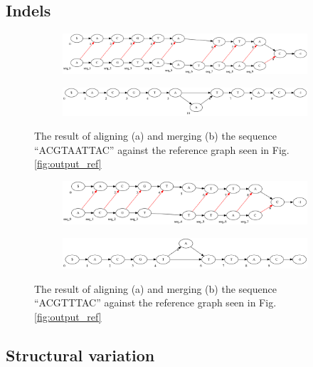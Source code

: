 \documentclass[thesis.tex]{subfiles}
\begin{document}
\subsection{Indels}
\begin{figure}[H]
  \begin{subfigure}[t]{\textwidth}
    \begin{mdframed}
      \includegraphics[width=\textwidth]{outputs/insertion-alignment.png}
    \end{mdframed}
    \subcaption{}
  \end{subfigure}
  \begin{subfigure}[t]{\textwidth}
    \begin{mdframed}
      \includegraphics[width=\textwidth]{outputs/insertion-merge.png}
    \end{mdframed}
    \subcaption{}
  \end{subfigure}
  \caption{The result of aligning (a) and merging (b) the sequence ``ACGTAATTAC'' against the reference graph seen in Fig. \ref{fig:output_ref}}
  \label{fig:output_insertion}
\end{figure}
\begin{figure}[H]
  \begin{subfigure}[t]{\textwidth}
    \begin{mdframed}
      \includegraphics[width=\textwidth]{outputs/deletion-alignment.png}
    \end{mdframed}
    \subcaption{}
  \end{subfigure}
  \begin{subfigure}[t]{\textwidth}
    \begin{mdframed}
      \includegraphics[width=\textwidth]{outputs/deletion-merge.png}
    \end{mdframed}
    \subcaption{}
  \end{subfigure}
  \caption{The result of aligning (a) and merging (b) the sequence ``ACGTTTAC'' against the reference graph seen in Fig. \ref{fig:output_ref}}
  \label{fig:output_deletion}
\end{figure}
\subsection{Structural variation}
\end{document}
